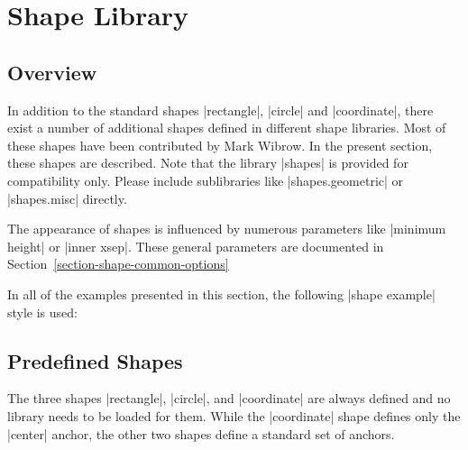 %
%
%


\section[library-shapes]{Shape Library}
\label{section-libs-shapes}

\subsection{Overview}

In addition to the standard shapes |rectangle|, |circle| and |coordinate|,
there exist a number of additional shapes defined in different shape libraries.
Most of these shapes have been contributed by Mark Wibrow. In the present
section, these shapes are described. Note that the library |shapes| is provided
for compatibility only. Please include sublibraries like |shapes.geometric| or
|shapes.misc| directly.

The appearance of shapes is influenced by numerous parameters like
|minimum height| or |inner xsep|. These general parameters are documented in
Section~\ref{section-shape-common-options}

In all of the examples presented in this section, the following |shape example|
style is used:
%
\begin{codeexample}
\end{codeexample}


\subsection{Predefined Shapes}
\label{section-predefined-shapes}

The three shapes |rectangle|, |circle|, and |coordinate| are always defined and
no library needs to be loaded for them. While the |coordinate| shape defines
only the |center| anchor, the other two shapes define a standard set of
anchors.

